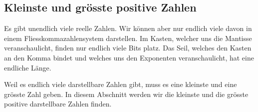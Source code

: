 \subsection{Kleinste und grösste positive Zahlen}

Es gibt unendlich viele reelle Zahlen. Wir können aber nur endlich viele davon in einem Fliesskommazahlensystem darstellen. Im Kasten, welcher uns die Mantisse veranschaulicht, finden nur endlich viele Bits platz. Das Seil, welches den Kasten an den Komma bindet und welches uns den Exponenten veranschaulicht, hat eine endliche Länge.

Weil es endlich viele darstellbare Zahlen gibt, muss es eine kleinste und eine grösste Zahl geben. In diesem Abschnitt werden wir die kleinste und die grösste positive darstellbare Zahlen finden.


